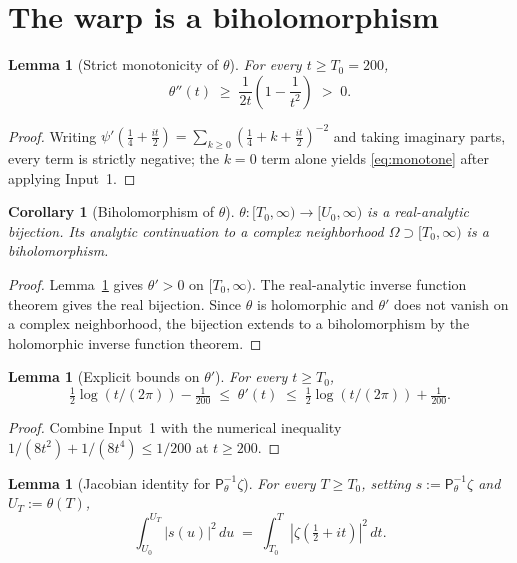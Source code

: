 \documentclass[11pt,a4paper]{article}
\newtheorem{lemma}[theorem]{Lemma}
\newtheorem{corollary}[theorem]{Corollary}
\theoremstyle{definition}
\newcommand{\ipp}{\mathsf{P}_\theta^{-1}}
\begin{document}
\section{The warp is a biholomorphism}
\label{sec:warp}

\begin{lemma}[Strict monotonicity of $\theta$]\label{lem:monotone}
For every $t \ge T_0 = 200$,
\begin{equation}
  \theta''(t) \;\ge\; \frac{1}{2t}\!\left(1 - \frac{1}{t^2}\right) \;>\; 0.
  \label{eq:monotone}
\end{equation}
\end{lemma}

\begin{proof}
Writing $\psi'(\tfrac14+\tfrac{it}{2}) = \sum_{k\ge0}(\tfrac14+k+\tfrac{it}{2})^{-2}$
and taking imaginary parts, every term is strictly negative; the $k=0$ term alone
yields \eqref{eq:monotone} after applying Input~1.
\end{proof}

\begin{corollary}[Biholomorphism of $\theta$]\label{cor:biholomorphism}
$\theta\colon[T_0,\infty)\to[U_0,\infty)$ is a real-analytic bijection.
Its analytic continuation to a complex neighborhood
$\Omega \supset [T_0,\infty)$ is a biholomorphism.
\end{corollary}

\begin{proof}
Lemma~\ref{lem:monotone} gives $\theta'>0$ on $[T_0,\infty)$. The real-analytic
inverse function theorem gives the real bijection. Since $\theta$ is holomorphic
and $\theta'$ does not vanish on a complex neighborhood, the bijection extends to a
biholomorphism by the holomorphic inverse function theorem.
\end{proof}

\begin{lemma}[Explicit bounds on $\theta'$]\label{lem:thetaprime-bounds}
For every $t \ge T_0$,
\begin{equation}
  \tfrac12\log(t/(2\pi)) - \tfrac{1}{200} \;\le\; \theta'(t) \;\le\;
  \tfrac12\log(t/(2\pi)) + \tfrac{1}{200}.
\end{equation}
\end{lemma}

\begin{proof}
Combine Input~1 with the numerical inequality
$1/(8t^2)+1/(8t^4) \le 1/200$ at $t\ge 200$.
\end{proof}

\begin{lemma}[Jacobian identity for $\ipp\zeta$]\label{lem:jacobian}
For every $T\ge T_0$, setting $s := \ipp\zeta$ and $U_T := \theta(T)$,
\begin{equation}
  \int_{U_0}^{U_T} |s(u)|^2\,du \;=\; \int_{T_0}^{T} |\zeta(\tfrac12+it)|^2\,dt.
  \label{eq:jacobian}
\end{equation}
\end{lemma}
\end{document}
